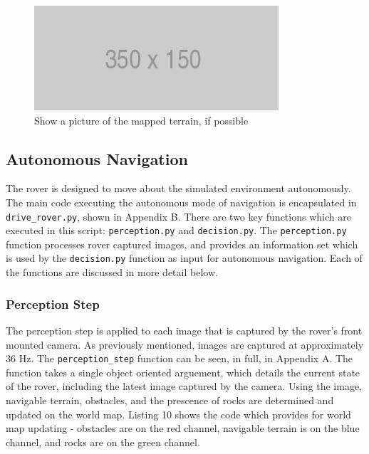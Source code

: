 \documentclass[a4paper]{article}
\begin{document}
\begin{figure}[h]
\centering
\includegraphics[scale=0.5]{placeholder}
\caption{Show a picture of the mapped terrain, if possible}
\end{figure}

\newpage

\subsection{Autonomous Navigation}
The rover is designed to move about the simulated environment autonomously. The main code executing the autonomous mode of navigation is encapsulated in \verb|drive_rover.py|, shown in Appendix B. There are two key functions which are executed in this script: \verb|perception.py| and \verb|decision.py|. The \verb|perception.py| function processes rover captured images, and provides an information set which is used by the \verb|decision.py| function as input for autonomous navigation. Each of the functions are discussed in more detail below.

\subsubsection{Perception Step}
The perception step is applied to each image that is captured by the rover's front mounted camera. As previously mentioned, images are captured at approximately 36 $\si{\hertz}$. The \verb|perception_step| function can be seen, in full, in Appendix A. The function takes a single object oriented arguement, which details the current state of the rover, including the latest image captured by the camera. Using the image, navigable terrain, obstacles, and the prescence of rocks are determined and updated on the world map. Listing 10 shows the code which provides for world map updating - obstacles are on the red channel, navigable terrain is on the blue channel, and rocks are on the green channel.
\end{document}
